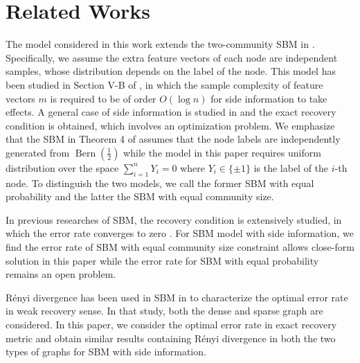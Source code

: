 \documentclass[conference,letterpaper]{IEEEtran}
\DeclareMathOperator{\Bern}{Bern}
\begin{document}
\section{Related Works}\label{s:rw}
The model considered in this work extends the two-community SBM in \cite{abbe2015community}.
Specifically, we assume the extra feature vectors of each node are independent samples, whose distribution depends on the label of the node.
This model has been studied in Section V-B of \cite{saad2018community}, in which the sample complexity of feature vectors
$m$ is required to be of order $O(\log n)$ for side information to take effects.
A general case of side information is studied
in \cite{abbe17sideinfo} and the exact recovery condition is obtained, which involves an optimization problem.
We emphasize that the SBM in Theorem 4 of \cite{abbe17sideinfo}
assumes that the node labels are independently generated  from $\Bern(\frac{1}{2})$ while the model
in this paper requires uniform distribution over the space $\sum_{i=1}^n Y_i = 0$ where $Y_i \in \{\pm 1 \}$ is the label of the $i$-th node.
To distinguish the two models, we call the former SBM with equal probability
and the latter the SBM with equal community size.

In previous researches of SBM, the recovery condition is extensively studied, in which the error rate converges
to zero \cite{abbe2015exact}. 
For SBM model with side information, we find the error rate of SBM with equal community size constraint allows close-form solution 
in this paper while the error rate for SBM with
equal probability remains an open problem.

Rényi divergence has been used in SBM in \cite{zhang2016} to characterize the optimal error rate in weak
recovery sense. In that study, both the dense and sparse graph are considered. In this paper, we consider the optimal error rate in exact recovery metric and obtain similar results containing
Rényi divergence
in both the two types of graphs for SBM with side information.
\end{document}
